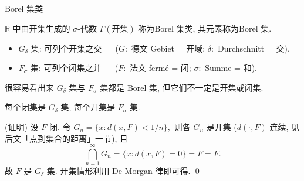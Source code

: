 \begin{frame}{Borel 集类}

\begin{Def}[Borel 集类]
$\mathbb{R}$ 中由开集生成的 $\sigma$-代数 $\Gamma(\text{开集})$ 称为\alert{Borel 集类}, 其元素称为\alert{Borel 集}.
\end{Def}

\begin{eg}
\begin{itemize}
\item \alert{$G_\delta$ 集}: 可列个开集之交 ~~ ($G:$ 德文 Gebiet = 开域; $\delta:$ Durchschnitt = 交).
\item \alert{$F_\sigma$ 集}: 可列个闭集之并 ~~ ($F:$ 法文 fermé = 闭; $\sigma:$ Summe = 和).
\end{itemize}
很容易看出来 $G_\delta$ 集与 $F_\sigma$ 集都是 Borel 集, 但它们不一定是开集或闭集.
\end{eg}

\pause

\begin{prop}
每个闭集是 $G_\delta$ 集; 每个开集是 $F_\sigma$ 集.
\end{prop}

\startproof[bg=yellow, fg=red](证明)
设 $F$ 闭. 令 $G_n = \{x : d(x, F) < 1/n\},$ 则各 $G_n$ 是开集 ($d(\cdot, F)$ 连续, 见后文「点到集合的距离」一节), 且
\[
\bigcap_{n=1}^\infty G_n = \{x : d(x,F) = 0\} = \overline{F} = F.
\]
故 $F$ 是 $G_\delta$ 集. 开集情形利用 De Morgan 律即可得.
\qed

\end{frame}


